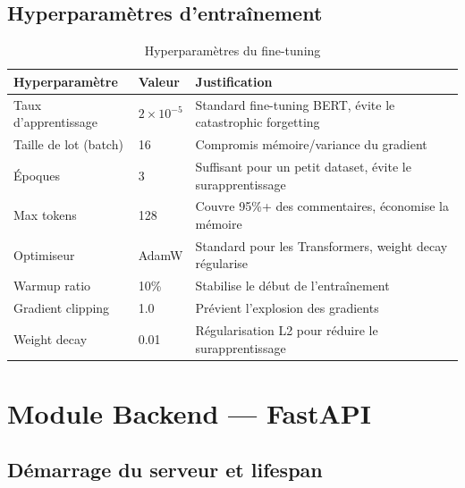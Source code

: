 \subsection{Hyperparamètres d'entraînement}

\begin{table}[H]
\centering
\caption{Hyperparamètres du fine-tuning}
\label{tab:hyperparams}
\renewcommand{\arraystretch}{1.4}
\begin{tabular}{lll}
\toprule
\rowcolor{bleuprincipal!15}
\textbf{Hyperparamètre} & \textbf{Valeur} & \textbf{Justification} \\
\midrule
Taux d'apprentissage & $2 \times 10^{-5}$ & Standard fine-tuning BERT, évite le catastrophic forgetting \\
\rowcolor{gray!8}
Taille de lot (batch) & 16 & Compromis mémoire/variance du gradient \\
Époques & 3 & Suffisant pour un petit dataset, évite le surapprentissage \\
\rowcolor{gray!8}
Max tokens & 128 & Couvre 95\%+ des commentaires, économise la mémoire \\
Optimiseur & AdamW & Standard pour les Transformers, weight decay régularise \\
\rowcolor{gray!8}
Warmup ratio & 10\% & Stabilise le début de l'entraînement \\
Gradient clipping & 1.0 & Prévient l'explosion des gradients \\
\rowcolor{gray!8}
Weight decay & 0.01 & Régularisation L2 pour réduire le surapprentissage \\
\bottomrule
\end{tabular}
\end{table}

\section{Module Backend — FastAPI}

\subsection{Démarrage du serveur et lifespan}

